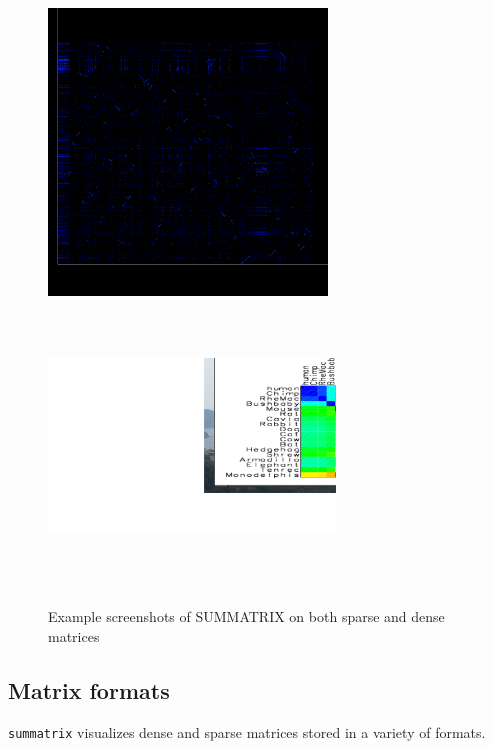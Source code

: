 \documentclass[12pt]{article}
\newcommand{\code}[1]{{\tt #1}}
\begin{document}
\begin{figure}
\begin{center}
\includegraphics[height=3in]{figures/summatrix.pdf}
\includegraphics[width=3in,height=3in]{figures/summatrix-mammals.pdf}
\end{center}
\caption{Example screenshots of SUMMATRIX on both sparse and dense matrices}
\label{fig:summatrix}
\end{figure}


\subsection{Matrix formats}

\code{summatrix} visualizes dense and sparse matrices stored in a variety of 
formats.
\end{document}
